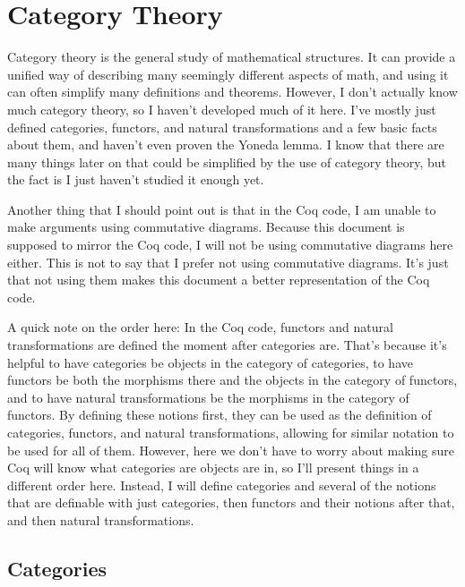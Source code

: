 \documentclass[../../math.tex]{subfiles}
\begin{document}
\setcounter{chapter}{5}

\chapter{Category Theory}

Category theory is the general study of mathematical structures.  It can provide
a unified way of describing many seemingly different aspects of math, and using
it can often simplify many definitions and theorems.  However, I don't actually
know much category theory, so I haven't developed much of it here.  I've mostly
just defined categories, functors, and natural transformations and a few basic
facts about them, and haven't even proven the Yoneda lemma.  I know that there
are many things later on that could be simplified by the use of category theory,
but the fact is I just haven't studied it enough yet.

Another thing that I should point out is that in the Coq code, I am unable to
make arguments using commutative diagrams.  Because this document is supposed to
mirror the Coq code, I will not be using commutative diagrams here either.  This
is not to say that I prefer not using commutative diagrams.  It's just that not
using them makes this document a better representation of the Coq code.

A quick note on the order here: In the Coq code, functors and natural
transformations are defined the moment after categories are.  That's because
it's helpful to have categories be objects in the category of categories, to
have functors be both the morphisms there and the objects in the category of
functors, and to have natural transformations be the morphisms in the category
of functors.  By defining these notions first, they can be used as the
definition of categories, functors, and natural transformations, allowing for
similar notation to be used for all of them.  However, here we don't have to
worry about making sure Coq will know what categories are objects are in, so
I'll present things in a different order here.  Instead, I will define
categories and several of the notions that are definable with just categories,
then functors and their notions after that, and then natural transformations.

\section{Categories}
\end{document}
